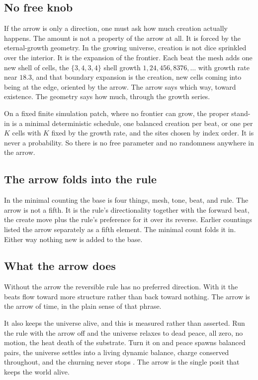 \subsection{No free knob}

If the arrow is only a direction, one must ask how much creation actually happens. The amount is not a property of
the arrow at all. It is forced by the eternal-growth geometry. In the growing universe, creation is not dice
sprinkled over the interior. It is the expansion of the frontier. Each beat the mesh adds one new shell of cells,
the $\{3,4,3,4\}$ shell growth $1, 24, 456, 8376, \ldots$ with growth rate near $18.3$, and that boundary
expansion is the creation, new cells coming into being at the edge, oriented by the arrow. The arrow says which
way, toward existence. The geometry says how much, through the growth series.

On a fixed finite simulation patch, where no frontier can grow, the proper stand-in is a minimal deterministic
schedule, one balanced creation per beat, or one per $K$ cells with $K$ fixed by the growth rate, and the sites
chosen by index order. It is never a probability. So there is no free parameter and no randomness anywhere in the
arrow.

\subsection{The arrow folds into the rule}

In the minimal counting the base is four things, mesh, tone, beat, and rule. The arrow is not a fifth. It is the
rule's directionality together with the forward beat, the create move plus the rule's preference for it over its
reverse. Earlier countings listed the arrow separately as a fifth element. The minimal count folds it in.
Either way nothing new is added to the base.

\subsection{What the arrow does}

Without the arrow the reversible rule has no preferred direction. With it the beats flow toward more structure
rather than back toward nothing. The arrow is the arrow of time, in the plain sense of that phrase.

It also keeps the universe alive, and this is measured rather than asserted. Run the rule with the arrow off and
the universe relaxes to dead peace, all zero, no motion, the heat death of the substrate. Turn it on and peace
spawns balanced pairs, the universe settles into a living dynamic balance, charge conserved throughout, and the
churning never stops \cite{pollard2026vibetest}. The arrow is the single posit that keeps the world alive.


